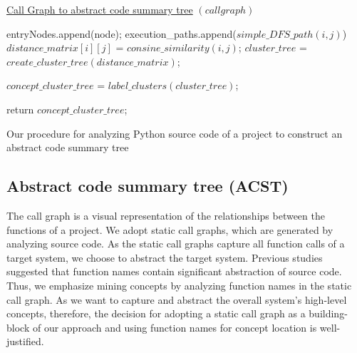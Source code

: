 \label{approach}

\begin{algorithm}
    
    \underline{Call Graph to abstract code summary tree} $(call graph)$\;
    
    {
        {
            entryNodes.append(node);
        }
    } 
    {
        {
            execution\_paths.append($simple\_DFS\_path(i, j)$)
        }
    }
    {
        {
            $distance\_matrix[i][j]$ = $consine\_similarity(i,j)$;
        }
    }
    $cluster\_tree$ = $create\_cluster\_tree(distance\_matrix)$;
    
    $concept\_cluster\_tree$ = $label\_clusters(cluster\_tree)$;
    
    return $concept\_cluster\_tree$;
    \caption{Our procedure for analyzing Python source code of a project to construct an abstract code summary tree}
    \label{alg:overall}
\end{algorithm}

\subsection{Abstract code summary tree (ACST)}
\label{approach_cct}
The call graph is a visual representation of the relationships between the functions of a project. We adopt static call graphs, which are generated by analyzing source code. As the static call
graphs capture all function calls of a target system, we
choose to abstract the target system. Previous studies suggested that function names contain significant abstraction of source code. Thus, we emphasize mining concepts by analyzing function names in the static call graph.
As we want to capture and abstract the overall system's high-level concepts, therefore, the decision for adopting a static call graph as a building-block of our approach and using function names for concept location is well-justified.  

